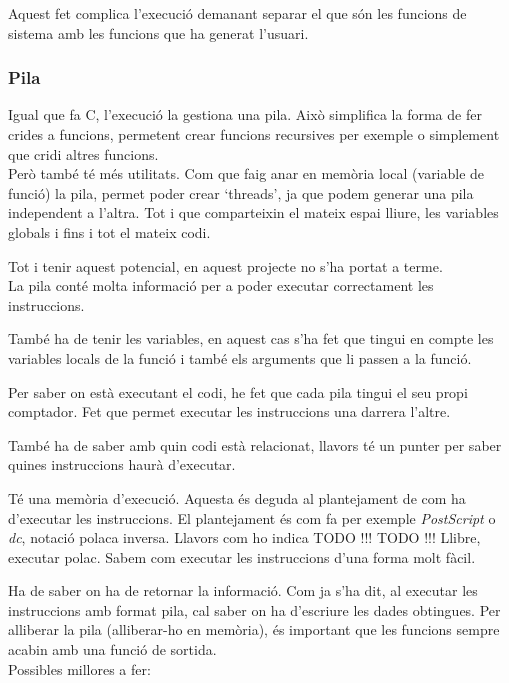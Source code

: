 Aquest fet complica l'execució demanant separar el que són les funcions
de sistema amb les funcions que ha generat l'usuari.

\subsubsection{Pila}
Igual que fa C, l'execució la gestiona una pila.
Això simplifica la forma de fer crides a funcions,
permetent crear funcions recursives per exemple o simplement que
cridi altres funcions.\\

Però també té més utilitats.
Com que faig anar en memòria local (variable de funció) la pila,
permet poder crear `threads',
ja que podem generar una pila independent a l'altra.
Tot i que comparteixin el mateix espai lliure, les variables globals i fins i tot el mateix codi.

Tot i tenir aquest potencial, en aquest projecte no s'ha portat a terme.\\

La pila conté molta informació per a poder executar correctament les instruccions.


També ha de tenir les variables,
en aquest cas s'ha fet que tingui en compte les variables locals de la funció
i també els arguments que li passen a la funció.

Per saber on està executant el codi,
he fet que cada pila tingui el seu propi comptador.
Fet que permet executar les instruccions una darrera l'altre.

També ha de saber amb quin codi està relacionat,
llavors té un punter per saber quines instruccions haurà d'executar.

Té una memòria d'execució.
Aquesta és deguda al plantejament de com ha d'executar les instruccions.
El plantejament és com fa per exemple \textit{PostScript} o \textit{dc},
notació polaca inversa.
Llavors com ho indica TODO !!! TODO !!! Llibre, executar polac.
Sabem com executar les instruccions d'una forma molt fàcil.

Ha de saber on ha de retornar la informació.
Com ja s'ha dit, al executar les instruccions amb format pila,
cal saber on ha d'escriure les dades obtingues.
Per alliberar la pila (alliberar-ho en memòria),
és important que les funcions sempre acabin amb una funció de sortida.\\

Possibles millores a fer:


